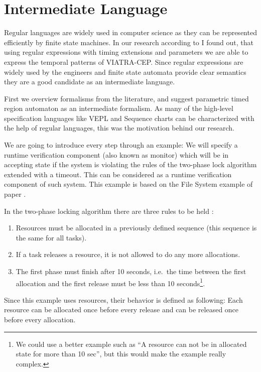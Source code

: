 	\chapter{Intermediate Language}
	\label{chap:cep}
	
	
	Regular languages are widely used in computer science as they can be represented efficiently by finite state machines.		
	In our research according to \citep{davidi} I found out, that using regular expressions with timing extensions and parameters we are able to express the temporal patterns of VIATRA-CEP.
	Since regular expressions are widely used by the engineers and finite state automata provide clear semantics they are a good candidate as an intermediate language.
	
	First we overview formalisms from the literature, and suggest parametric timed region automaton as an intermediate formalism.
	As many of the high-level specification languages like VEPL and Sequence charts can be characterized with the help of regular languages,
	this was the motivation behind our research.%
	
	We are going to introduce every step through an example: 
	We will specify a runtime verification component (also known as monitor) which will be in accepting state if the system is violating the rules of the two-phase lock algorithm extended with a timeout.
	This can be considered as a runtime verification component of such system. This example is based on the File System example of paper \citep{marq}.
	
	In the two-phase locking algorithm there are three rules to be held :
	\begin{enumerate}
		\item Resources must be allocated in a previously defined sequence (this sequence is the same for all tasks).
		\item If a task releases a resource, it is not allowed to do any more allocations.
		\item The first phase must finish after 10 seconds, i.e.~the time between the first allocation and the first release must be less than 10 seconds\footnote{We could use a better example such as ``A resource can not be in allocated state for more than 10 sec'', but this would make the example really complex.}. 
	\end{enumerate}
	
	Since this example uses resources, their behavior is defined as following:
	Each resource can be allocated once before every release and can be released once before every allocation.
		
